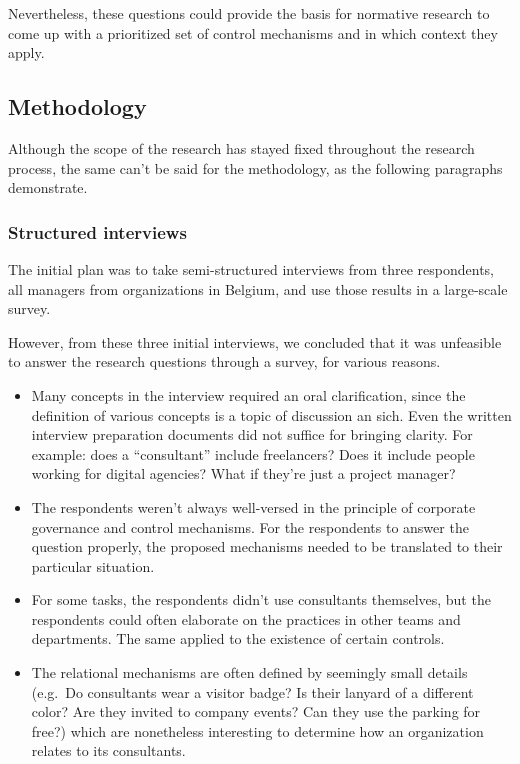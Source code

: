 \documentclass[12pt]{article}
\begin{document}
Nevertheless, these questions could provide the basis for normative
research to come up with a prioritized set of control mechanisms and in
which context they apply.

\subsection{Methodology}\label{methodology}

Although the scope of the research has stayed fixed throughout the
research process, the same can't be said for the methodology, as the
following paragraphs demonstrate.

\subsubsection{Structured interviews}\label{structured-interviews}

The initial plan was to take semi-structured interviews from three
respondents, all managers from organizations in Belgium, and use those
results in a large-scale survey.

However, from these three initial interviews, we concluded that it was
unfeasible to answer the research questions through a survey, for
various reasons.

\begin{itemize}
\item
  Many concepts in the interview required an oral clarification, since
  the definition of various concepts is a topic of discussion an sich.
  Even the written interview preparation documents did not suffice for
  bringing clarity. For example: does a ``consultant'' include
  freelancers? Does it include people working for digital agencies? What
  if they're just a project manager?
\item
  The respondents weren't always well-versed in the principle of
  corporate governance and control mechanisms. For the respondents to
  answer the question properly, the proposed mechanisms needed to be
  translated to their particular situation.
\item
  For some tasks, the respondents didn't use consultants themselves, but
  the respondents could often elaborate on the practices in other teams
  and departments. The same applied to the existence of certain
  controls.
\item
  The relational mechanisms are often defined by seemingly small details
  (e.g.~Do consultants wear a visitor badge? Is their lanyard of a
  different color? Are they invited to company events? Can they use the
  parking for free?) which are nonetheless interesting to determine how
  an organization relates to its consultants.
\end{itemize}
\end{document}
